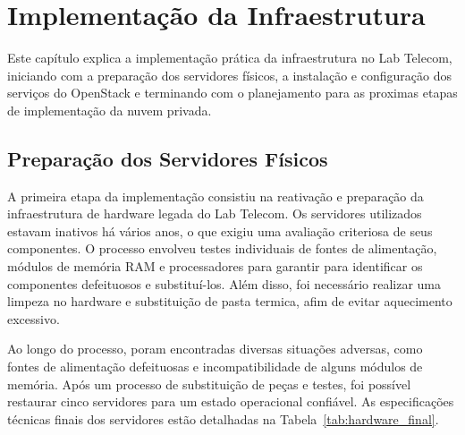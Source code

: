 \chapter{Implementação da Infraestrutura}

Este capítulo explica a implementação prática da infraestrutura no Lab Telecom, iniciando com a preparação dos servidores físicos, a instalação e configuração dos serviços do OpenStack e terminando com o planejamento para as proximas etapas de implementação da nuvem privada.

\section{Preparação dos Servidores Físicos}

A primeira etapa da implementação consistiu na reativação e preparação da infraestrutura de hardware legada do Lab Telecom. Os servidores utilizados estavam inativos há vários anos, o que exigiu uma avaliação criteriosa de seus componentes. O processo envolveu testes individuais de fontes de alimentação, módulos de memória RAM e processadores para garantir para identificar os componentes defeituosos e substituí-los. Além disso, foi necessário realizar uma limpeza no hardware e substituição de pasta termica, afim de evitar aquecimento excessivo.

Ao longo do processo, poram encontradas diversas situações adversas, como fontes de alimentação defeituosas e incompatibilidade de alguns módulos de memória. Após um processo de substituição de peças e testes, foi possível restaurar cinco servidores para um estado operacional confiável. As especificações técnicas finais dos servidores estão detalhadas na Tabela~\ref{tab:hardware_final}.

